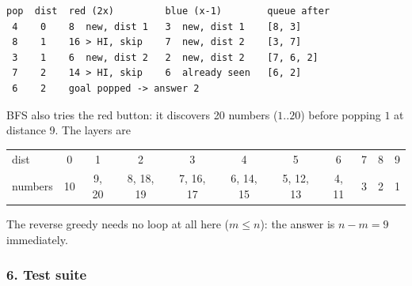 \begin{tracebox}[{Sample 1: BFS from $n=4$ to $m=6$, window $[1, 12]$}]

\begin{lstlisting}[style=trace]
pop  dist  red (2x)         blue (x-1)        queue after
 4    0    8  new, dist 1   3  new, dist 1    [8, 3]
 8    1    16 > HI, skip    7  new, dist 2    [3, 7]
 3    1    6  new, dist 2   2  new, dist 2    [7, 6, 2]
 7    2    14 > HI, skip    6  already seen   [6, 2]
 6    2    goal popped -> answer 2
\end{lstlisting}
\end{tracebox}

\begin{tracebox}[{Sample 2: $n = 10$, $m = 1$ --- BFS explores more than it needs}]
BFS also tries the red button: it discovers 20 numbers ($1..20$) before popping $1$ at distance 9. The layers are
\begin{center}\small
\begin{tabular}{@{}l*{10}{c}@{}}
\toprule
dist & 0 & 1 & 2 & 3 & 4 & 5 & 6 & 7 & 8 & 9 \\
numbers & 10 & 9, 20 & 8, 18, 19 & 7, 16, 17 & 6, 14, 15 & 5, 12, 13 & 4, 11 & 3 & 2 & 1 \\
\bottomrule
\end{tabular}
\end{center}
The reverse greedy needs no loop at all here ($m \le n$): the answer is $n - m = 9$ immediately.
\end{tracebox}

\subsubsection*{6. Test suite}

